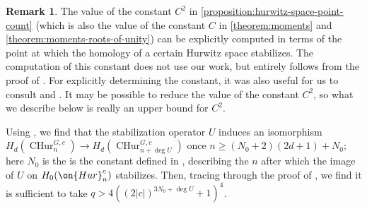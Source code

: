 \documentclass[12 pt]{amsart}
\theoremstyle{plain}
\theoremstyle{definition}
\newtheorem{remark}[theorem]{Remark}
\theoremstyle{remark}
\numberwithin{equation}{section}
\newcommand{\cphurc}[3]{\operatorname{CHur}^{#1, #3}_{#2}}
\begin{document}
\begin{remark}\label{remark:explicitconstant}
	The value of the constant $C^2$ in
	\autoref{proposition:hurwitz-space-point-count}
	(which is also the value of the constant $C$ in
		\autoref{theorem:moments} and
	\autoref{theorem:moments-roots-of-unity}) can be
	explicitly computed in terms of the point at which the homology of a certain
	Hurwitz space stabilizes.
	The computation of this constant does not use our work, but entirely follows
	from the proof of \cite{EllenbergVW:cohenLenstra}.
	For explicitly determining the constant, it was also useful for us to consult
	\cite{randal-williams:homology-of-hurwitz-spaces} and
	\cite{ellenbergL:homological-stability-for-generalized-hurwitz-spaces}.
	It may be possible to reduce the value of the constant $C^2$,
	so what we describe below
	is really an upper bound for $C^2$.
	
	Using \cite[Proposition 4.4, Proposition 8.1, Theorem 7.1, and Corollary
	7.4]{randal-williams:homology-of-hurwitz-spaces},
	we find that the stabilization operator $U$ 
	induces an isomorphism
	$H_d(
	\cphurc G n c) \to H_d(\cphurc G {n+\deg U} c)$ once 
	$n \geq (N_0+2)(2d+1) + N_0$; here $N_0$ is the 
	is the constant
	defined in \cite[Proposition 4.4]{randal-williams:homology-of-hurwitz-spaces},
	describing the $n$ after which the image of $U$ on
	$H_0(\on{Hur}_n^c)$ stabilizes.
	Then, tracing through the proof of 
	\cite[Theorem 4.1.3, Proposition
	4.3.3, Theorem 9.2.4]{ellenbergL:homological-stability-for-generalized-hurwitz-spaces},
	we find it is sufficient to take 
	$q > 4((2 |c|)^{3N_0 +\deg U}+1)^4$.
	

\end{remark}
\end{document}
